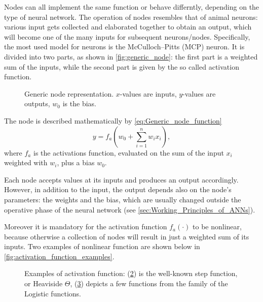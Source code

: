 Nodes can all implement the same function or behave differntly, depending on the type of neural network.
The operation of nodes resembles that of animal neurons: various input gets collected and elaborated together to obtain an output, which will become one of the many inputs for subsequent neurons/nodes.
Specifically, the most used model for neurons is the McCulloch–Pitts (MCP) neuron.
It is divided into two parts, as shown in \autoref{fig:generic_node}: the first part is a weighted sum of the inputs, while the second part is given by the so called activation function.
\newpage
\begin{figure}[ht]
	\centering
	
	\caption{Generic node representation. $x$-values are inputs, $y$-values are outputs, $w_0$ is the bias.}
	\label{fig:generic_node}
\end{figure}
The node is described mathematically by \cref{eq:Generic_node_function}
\begin{equation}
y = f_a \left(  w_0 + \sum_{i=1}^{n} w_i x_i \right),
\label{eq:Generic_node_function}
\end{equation}
where $f_a$ is the activations function, evaluated on the sum of the input $x_i$ weighted with $w_i$, plus a bias $w_0$.

Each node accepts values at its inputs and produces an output accordingly.
However, in addition to the input, the output depends also on the node's parameters: the weights and the bias, which are usually changed outside the operative phase of the neural network (see \autoref{sec:Working_Principles_of_ANNs}).

Moreover it is mandatory for the activation function $f_a\left(\cdot\right)$ to be nonlinear, because otherwise a collection of nodes will result in just a weighted sum of its inputs.
Two examples of nonlinear function are shown below in \autoref{fig:activation_function_examples}.

\begin{figure}[ht]
	\begin{subfigure}[b]{0.49\textwidth}
		\centering
		
		\caption{}
		\label{fig:activation_function_example_1}
  \end{subfigure}
  \begin{subfigure}[b]{0.49\textwidth}
  		\centering
		
		\caption{}
		\label{fig:activation_function_example_2}
  \end{subfigure}
  \caption{Examples of activation function: (\ref{fig:activation_function_example_1}) is the well-known step function, or Heaviside $\Theta$, (\ref{fig:activation_function_example_2}) depicts a few functions from the family of the Logistic functions.}
  	\label{fig:activation_function_examples}
\end{figure}

